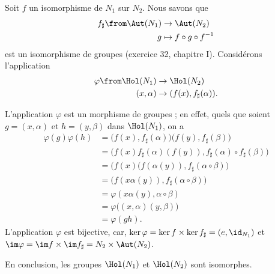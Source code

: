 Soit $f$ un isomorphisme de $N_1$ sur $N_2$.
Nous savons que
%
\begin{align*}
  f_\sharp\from\Aut(N_1) &\to \Aut(N_2) \\
  g &\mapsto f\circ g\circ f^{-1}
\end{align*}
%
est un isomorphisme de groupes (exercice 32, chapitre I).
Considérons l'application
\begin{align*}
  \varphi\from\Hol(N_1) &\to\Hol(N_2) \\
    (x, \alpha) &\to (f(x), f_\sharp(\alpha)).
\end{align*}

L'application $\varphi$ est un morphisme de groupes ; en effet, quels que soient  $g = (x, \alpha)$ et $h = (y, \beta)$ dans $\Hol(N_1)$, on a
\begin{align*}
  \varphi(g)\varphi(h)
    &= \bigl( f(x), f_\sharp(\alpha) \bigr) \bigl( f(y), f_\sharp(\beta) \bigr) \\
    &= \bigl( f(x) f_\sharp(\alpha)(f(y)), f_\sharp(\alpha)\circ f_\sharp(\beta) \bigr) \\
    &= \bigl( f(x) (f(\alpha(y)), f_\sharp(\alpha\circ\beta) \bigr) \\
    &= \bigl( f(x\alpha(y)), f_\sharp(\alpha\circ\beta) \bigr) \\
    &= \varphi(x\alpha(y), \alpha\circ\beta) \\
    &= \varphi\bigl( (x, \alpha)(y, \beta) \bigr) \\
    &= \varphi(gh).
\end{align*}
%
L'application $\varphi$ est bijective, car, $\ker \varphi = \ker f  \times \ker f_\sharp = (e, \id_{N_1})$ et $\im \varphi = \im f \times \im f_\sharp = N_2\times\Aut(N_2)$.

En conclusion, les groupes $\Hol(N_1)$ et $\Hol(N_2)$ sont isomorphes.

